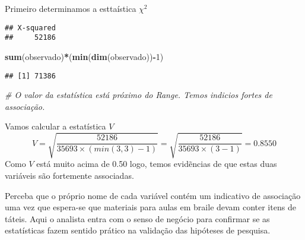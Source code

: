 \documentclass[11pt,]{style/krantz}
\makeatletter
\newenvironment{Shaded}{\begin{snugshade}}{\end{snugshade}}
\newcommand{\CommentTok}[1]{\textcolor[rgb]{0.56,0.35,0.01}{\textit{#1}}}
\newcommand{\DataTypeTok}[1]{\textcolor[rgb]{0.13,0.29,0.53}{#1}}
\newcommand{\DecValTok}[1]{\textcolor[rgb]{0.00,0.00,0.81}{#1}}
\newcommand{\KeywordTok}[1]{\textcolor[rgb]{0.13,0.29,0.53}{\textbf{#1}}}
\newcommand{\NormalTok}[1]{#1}
\newcommand{\OperatorTok}[1]{\textcolor[rgb]{0.81,0.36,0.00}{\textbf{#1}}}
\newcommand{\StringTok}[1]{\textcolor[rgb]{0.31,0.60,0.02}{#1}}
\renewenvironment{quote}{\begin{VF}}{\end{VF}}
\newenvironment{kframe}{%
\medskip{}
\setlength{\fboxsep}{.8em}
 \def\at@end@of@kframe{}%
 \ifinner\ifhmode%
  \def\at@end@of@kframe{\end{minipage}}%
  \begin{minipage}{\columnwidth}%
 \fi\fi%
 \def\FrameCommand##1{\hskip\@totalleftmargin \hskip-\fboxsep
 \colorbox{shadecolor}{##1}\hskip-\fboxsep
     \hskip-\linewidth \hskip-\@totalleftmargin \hskip\columnwidth}%
 \MakeFramed {\advance\hsize-\width
   \@totalleftmargin\z@ \linewidth\hsize
   \@setminipage}}%
 {\par\unskip\endMakeFramed%
 \at@end@of@kframe}
\renewenvironment{Shaded}{\begin{kframe}}{\end{kframe}}
\theoremstyle{definition}
\theoremstyle{definition}
\theoremstyle{definition}
\theoremstyle{remark}
\let\BeginKnitrBlock\begin \let\EndKnitrBlock\end
\makeatother
\begin{document}
\BeginKnitrBlock{solution}
\iffalse{} {Solução. } \fi{}Primeiro determinamos a esttaística \(\chi^2\)
\EndKnitrBlock{solution}

\begin{Shaded}
\end{Shaded}

\begin{verbatim}
## X-squared
##     52186
\end{verbatim}

\begin{Shaded}
\begin{Highlighting}[]
\KeywordTok{sum}\NormalTok{(observado)}\OperatorTok{*}\NormalTok{(}\KeywordTok{min}\NormalTok{(}\KeywordTok{dim}\NormalTok{(observado))}\OperatorTok{-}\DecValTok{1}\NormalTok{)}
\end{Highlighting}
\end{Shaded}

\begin{verbatim}
## [1] 71386
\end{verbatim}

\begin{Shaded}
\begin{Highlighting}[]
\CommentTok{# O valor da estatística está próximo do Range. Temos indicios fortes de associação.}
\end{Highlighting}
\end{Shaded}

Vamos calcular a estatística \(V\)
\[V = \sqrt{\frac{52186}{ 35693 \times (min(3,3)-1)}} = \sqrt{\frac{52186}{35693 \times (3-1)}} = 0.8550\]
Como \(V\) está muito acima de 0.50 logo, temos evidẽncias de que estas duas variáveis são fortemente associadas.

\begin{quote}
Perceba que o próprio nome de cada variável contém um indicativo de associação uma vez que espera-se que materiais para aulas em braile devam conter itens de táteis. Aqui o analista entra com o senso de negócio para confirmar se as estatísticas fazem sentido prático na validação das hipóteses de pesquisa.
\end{quote}
\end{document}
